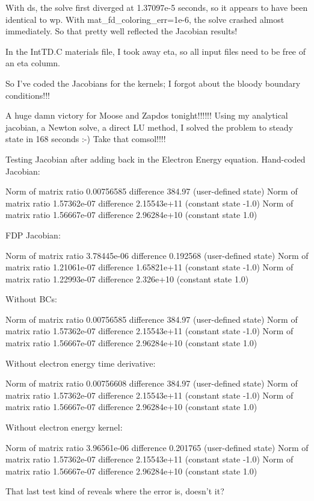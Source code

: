 With ds, the solve first diverged at 1.37097e-5 seconds, so it appears to have been identical to wp. With mat_fd_coloring_err=1e-6, the solve crashed almost immediately. So that pretty well reflected the Jacobian results!

In the IntTD.C materials file, I took away eta, so all input files need to be free of an eta column.

So I've coded the Jacobians for the kernels; I forgot about the bloody boundary conditions!!!

A huge damn victory for Moose and Zapdos tonight!!!!!! Using my analytical jacobian, a Newton solve, a direct LU method, I solved the problem to steady state in 168 seconds :-) Take that comsol!!!!

Testing Jacobian after adding back in the Electron Energy equation. Hand-coded Jacobian:

Norm of matrix ratio 0.00756585 difference 384.97 (user-defined state)
Norm of matrix ratio 1.57362e-07 difference 2.15543e+11 (constant state -1.0)
Norm of matrix ratio 1.56667e-07 difference 2.96284e+10 (constant state 1.0)

FDP Jacobian:

Norm of matrix ratio 3.78445e-06 difference 0.192568 (user-defined state)
Norm of matrix ratio 1.21061e-07 difference 1.65821e+11 (constant state -1.0)
Norm of matrix ratio 1.22993e-07 difference 2.326e+10 (constant state 1.0)

Without BCs:

Norm of matrix ratio 0.00756585 difference 384.97 (user-defined state)
Norm of matrix ratio 1.57362e-07 difference 2.15543e+11 (constant state -1.0)
Norm of matrix ratio 1.56667e-07 difference 2.96284e+10 (constant state 1.0)

Without electron energy time derivative:

Norm of matrix ratio 0.00756608 difference 384.97 (user-defined state)
Norm of matrix ratio 1.57362e-07 difference 2.15543e+11 (constant state -1.0)
Norm of matrix ratio 1.56667e-07 difference 2.96284e+10 (constant state 1.0)

Without electron energy kernel:

Norm of matrix ratio 3.96561e-06 difference 0.201765 (user-defined state)
Norm of matrix ratio 1.57362e-07 difference 2.15543e+11 (constant state -1.0)
Norm of matrix ratio 1.56667e-07 difference 2.96284e+10 (constant state 1.0)

That last test kind of reveals where the error is, doesn't it?

